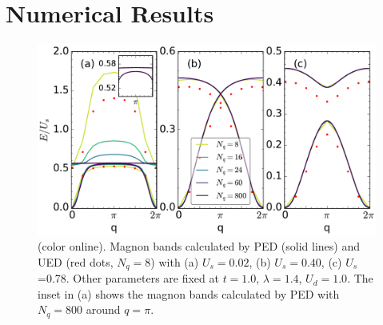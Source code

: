 \documentclass[amsmath,superscriptaddress,showpacs,aps,prb,twocolumn]{revtex4-1}
\begin{document}
\section{Numerical Results}\label{nr}
\begin{figure}
\includegraphics[scale=0.41]{spectrum}
\caption{(color online). Magnon bands calculated by PED (solid lines) and UED (red dots, $N_q=8$) with (a) $U_s=0.02$, (b) $U_s=0.40$, (c) $U_s$=0.78. Other parameters are fixed at $t=1.0$, $\lambda=1.4$, $U_d=1.0$. The inset in (a) shows the magnon bands calculated by PED with $N_q=800$ around $q=\pi$.}
\label{spectrum}
\end{figure}
\end{document}

